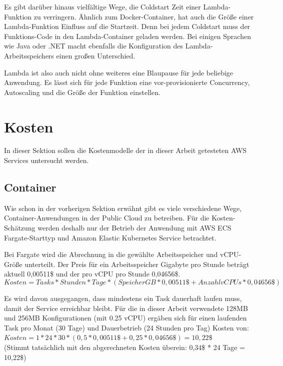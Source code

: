 Es gibt darüber hinaus vielfältige Wege, die Coldstart Zeit einer Lambda-Funktion zu verringern. Ähnlich zum Docker-Container, hat auch die Größe einer Lambda-Funktion Einfluss auf die Startzeit. Denn bei jedem Coldstart muss der Funktions-Code in den Lambda-Container geladen werden. Bei einigen Sprachen wie Java oder .NET macht ebenfalls die Konfiguration des Lambda-Arbeitsspeichers einen großen Unterschied\cite{malishev_aws_2019}. 

Lambda ist also auch nicht ohne weiteres eine Blaupause für jede beliebige Anwendung. Es lässt sich für jede Funktion eine vor-provisionierte Concurrency, Autoscaling und die Größe der Funktion einstellen. 

\section{Kosten}
\label{sec:kosten}
In dieser Sektion sollen die Kostenmodelle der in dieser Arbeit getesteten AWS Services untersucht werden.

\subsection{Container}
Wie schon in der vorherigen Sektion erwähnt gibt es viele verschiedene Wege, Container-Anwendungen in der Public Cloud zu betreiben. Für die Kosten-Schätzung werden deshalb nur der Betrieb der Anwendung mit AWS ECS Fargate-Starttyp und Amazon Elastic Kubernetes Service betrachtet.

Bei Fargate wird die Abrechnung in die gewählte Arbeitsspeicher und vCPU-Größe unterteilt. Der Preis für ein Arbeitsspeicher Gigabyte pro Stunde beträgt aktuell 0,00511\$ und der pro vCPU pro Stunde 0,04656\$.  \\


\begin{equation}
Kosten = Tasks * Stunden * Tage * (SpeicherGB * 0,00511\$ + AnzahlvCPUs * 0,04656\$)
\end{equation}

Es wird davon ausgegangen, dass mindestens ein Task dauerhaft laufen muss, damit der Service erreichbar bleibt. Für die in dieser Arbeit verwendete 128MB und 256MB Konfigurationen (mit 0.25 vCPU) ergäben sich für einen laufenden Task pro Monat (30 Tage) und Dauerbetrieb (24 Stunden pro Tag) Kosten von: \\

$Kosten = 1 * 24 * 30 * (0,5 * 0,00511\$ + 0,25 * 0,04656\$) = 10,22\$$ \\
(Stimmt tatsächlich mit den abgerechneten Kosten überein: 0,34\$ * 24 Tage = 10,22\$)

